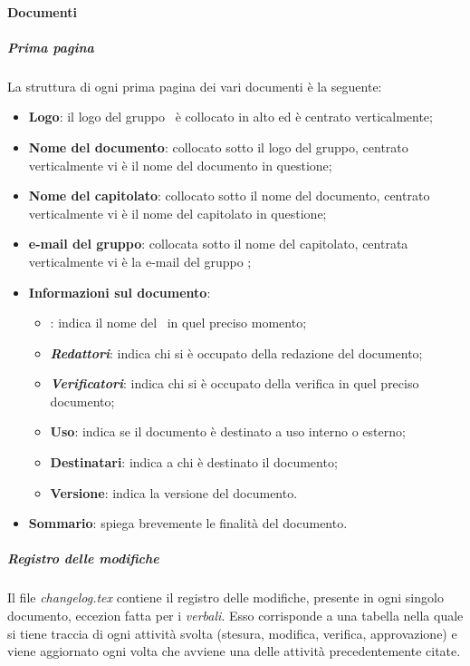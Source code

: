 \paragraph{Documenti}
\subparagraph{Prima pagina}
La struttura di ogni prima pagina dei vari documenti è la seguente:
\begin {itemize}
    \item \textbf{Logo}: il logo del gruppo \groupName\ è collocato in alto ed è centrato verticalmente;
    \item \textbf{Nome del documento}: collocato sotto il logo del gruppo, centrato verticalmente vi è il nome del documento in questione;
    \item \textbf{Nome del capitolato}: collocato sotto il nome del documento, centrato verticalmente vi è il nome del capitolato in questione;
    \item \textbf{e-mail del gruppo}: collocata sotto il nome del capitolato, centrata verticalmente vi è la e-mail del gruppo \groupName;
    \item \textbf{Informazioni sul documento}:
        \begin{itemize}
            \item \textbf{\roleProjectManager}: indica il nome del \roleProjectManagerLow\ in quel preciso momento;
            \item \textbf{\textit{Redattori}}: indica chi si è occupato della redazione del documento;
            \item \textbf{\textit{Verificatori}}: indica chi si è occupato della verifica in quel preciso documento;
            \item \textbf{Uso}: indica se il documento è destinato a uso interno o esterno;
            \item \textbf{Destinatari}: indica a chi è destinato il documento;
            \item \textbf{Versione}: indica la versione del documento. 
        \end{itemize}
    \item \textbf{Sommario}: spiega brevemente le finalità del documento.        
\end {itemize}
\subparagraph{Registro delle modifiche}
Il file \textit{changelog.tex} contiene il registro delle modifiche, presente in ogni singolo documento, eccezion fatta per i \textit{verbali}.
Esso corrisponde a una tabella nella quale si tiene traccia di ogni attività svolta (stesura, modifica, verifica, approvazione) e viene aggiornato ogni volta che avviene una delle attività precedentemente citate.
